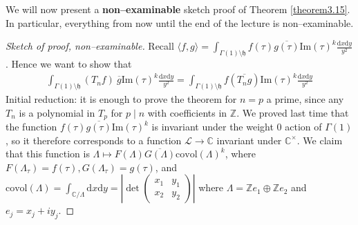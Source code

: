 \documentclass{article}
\theoremstyle{definition}
\begin{document}
We will now present a \textbf{non--examinable} sketch proof of Theorem \ref{theorem3.15}. In particular, everything from now until the end of the lecture is non--examinable.
\begin{proof}[Sketch of proof, non--examinable]
    Recall $\langle f,g \rangle = \int_{\Gamma(1)\setminus \mathfrak{h}}^{} f(\tau)\overline{g(\tau)}\text{Im}(\tau)^k\frac{\mathrm{d}x\mathrm{d}y}{y^2}$. Hence we want to show that 
    \begin{align*}
        \int_{\Gamma(1)\setminus \mathfrak{h}}^{} (T_n f)~\overline{g}\text{Im}(\tau)^k\frac{\mathrm{d}x\mathrm{d}y}{y^2} = \int_{\Gamma(1)\setminus \mathfrak{h}}^{} f (\overline{T_n g})\text{Im}(\tau)^k\frac{\mathrm{d}x\mathrm{d}y}{y^2}
    \end{align*}
    Initial reduction: it is enough to prove the theorem for $n=p$ a prime, since any $T_n$ is a polynomial in $T_p$ for $p \mid n$ with coefficients in $\mathbb{Z}$. We proved last time that the function $f(\tau)\overline{g(\tau)}\text{Im}(\tau)^k$ is invariant under the weight 0 action of $\Gamma(1)$, so it therefore corresponds to a function $\mathcal{L} \to \mathbb{C}$ invariant under $\mathbb{C}^\times$. We claim that this function is $\Lambda \mapsto F(\Lambda)\overline{G(\Lambda)}\text{covol}(\Lambda)^k$, where $F(\Lambda_\tau)=f(\tau), G(\Lambda_\tau) = g(\tau)$, and $\text{covol}(\Lambda)=\int_{\mathbb{C}/\Lambda}^{} \mathrm{d}x\mathrm{d}y = \left|\det \begin{pmatrix} x_1 & y_1\\x_2 & y_2 \end{pmatrix}\right|$ where $\Lambda = \mathbb{Z}e_1 \oplus \mathbb{Z}e_2$ and $e_j = x_j + i y_j$.
    \vspace{1mm}
     

\end{proof}
\end{document}
